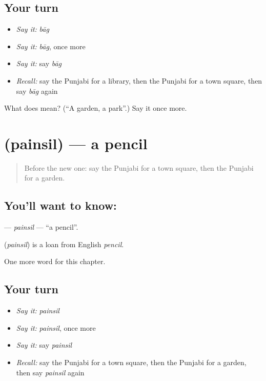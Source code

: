\subsection*{Your turn}
\begin{itemize}
\raggedright
  \item \emph{Say it:} \emph{bāg}
  \item \emph{Say it:} \emph{bāg}, once more
  \item \emph{Say it:} say \emph{bāg}
  \item \emph{Recall:} say the Punjabi for a library, then the Punjabi for a town square, then say \emph{bāg} again
\end{itemize}

\begin{tcolorbox}[breakable,colback=teal!4,colframe=teal!35!black,title={Before you move on}]
What does  mean? (\textquotedblleft{}A garden, a park\textquotedblright{}.) Say it once more.
\end{tcolorbox}
\section[\texorpdfstring{\pa{ਪੈਨਸਿਲ} (painsil)}{ਪੈਨਸਿਲ (painsil)}]{ (painsil) — a pencil}

\label{lesson:PA-C138-painsil}



\begin{quote}
Before the new one: say the Punjabi for a town square, then the Punjabi for a garden.
\end{quote}

\subsection*{You'll want to know: }
\textbf{} — \emph{painsil} — \textquotedblleft{}a pencil\textquotedblright{}.

\begin{cousinweb}
\textbf{} (\emph{painsil}) is a loan from English \emph{pencil}.
\end{cousinweb}

\begin{grammarlens}[title={What you've built}]
One more word for this chapter.
\end{grammarlens}

\subsection*{Your turn}
\begin{itemize}
\raggedright
  \item \emph{Say it:} \emph{painsil}
  \item \emph{Say it:} \emph{painsil}, once more
  \item \emph{Say it:} say \emph{painsil}
  \item \emph{Recall:} say the Punjabi for a town square, then the Punjabi for a garden, then say \emph{painsil} again
\end{itemize}

